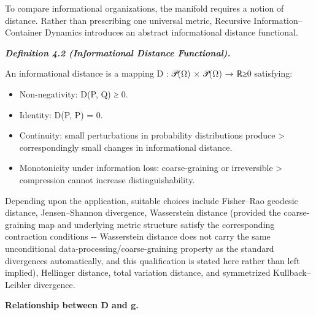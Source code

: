 \documentclass[
]{article}
\begin{document}
To compare informational organizations, the manifold requires a notion
of distance. Rather than prescribing one universal metric, Recursive
Information--Container Dynamics introduces an abstract informational
distance functional.

\emph{\textbf{Definition 4.2 (Informational Distance Functional).}}

An informational distance is a mapping D : 𝒫(Ω) × 𝒫(Ω) → ℝ≥0 satisfying:

\begin{itemize}
\item
  Non-negativity: D(P, Q) ≥ 0.
\item
  Identity: D(P, P) = 0.
\item
  Continuity: small perturbations in probability distributions produce
  \textgreater{} correspondingly small changes in informational
  distance.
\item
  Monotonicity under information loss: coarse-graining or irreversible
  \textgreater{} compression cannot increase distinguishability.
\end{itemize}

Depending upon the application, suitable choices include Fisher--Rao
geodesic distance, Jensen--Shannon divergence, Wasserstein distance
(provided the coarse-graining map and underlying metric structure
satisfy the corresponding contraction conditions -\/- Wasserstein
distance does not carry the same unconditional
data-processing/coarse-graining property as the standard divergences
automatically, and this qualification is stated here rather than left
implied), Hellinger distance, total variation distance, and symmetrized
Kullback--Leibler divergence.

\textbf{Relationship between D and g.}
\end{document}

